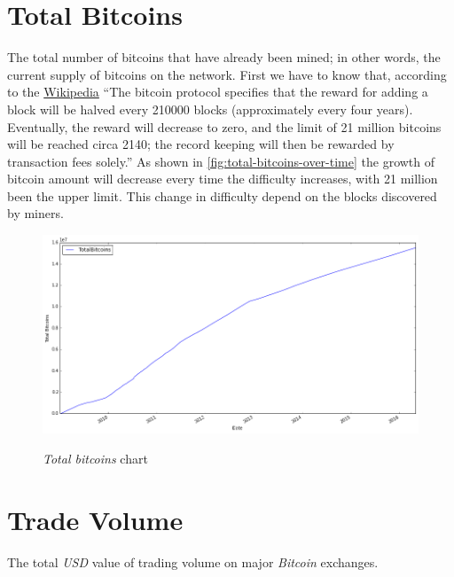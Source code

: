 
\section{Total Bitcoins}
\label{sec:total-bitcoins}

The total number of bitcoins that have already been mined; in other
words, the current supply of bitcoins on the network. First we have to
know that, according to the
\href{https://en.wikipedia.org/wiki/Bitcoin}{Wikipedia} ``The bitcoin
protocol specifies that the reward for adding a block will be halved
every 210000 blocks (approximately every four years). Eventually, the
reward will decrease to zero, and the limit of 21 million bitcoins
will be reached circa 2140; the record keeping will then be rewarded
by transaction fees solely.'' As shown in
\autoref{fig:total-bitcoins-over-time} the growth of bitcoin amount
will decrease every time the difficulty increases, with 21 million
been the upper limit. This change in difficulty depend on the blocks
discovered by miners.

\begin{figure}[bth]
  \myfloatalign
  {\includegraphics[width=1\linewidth]
    {gfx/total-bitcoins-over-time}}
  \caption{\textit{Total bitcoins} chart}
  \label{fig:total-bitcoins-over-time}
\end{figure}


\section{Trade Volume}
\label{sec:trade-volume}

The total \textit{USD} value of trading volume on major
\textit{Bitcoin} exchanges.

